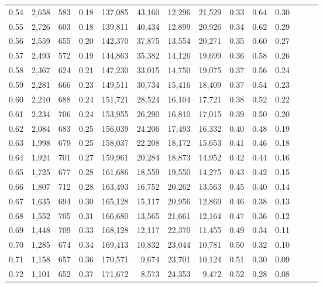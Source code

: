 \begin{tabular}{rrrrrrrrrrrrrr}
0.54 &  2,658 &  583 &  0.18 &  137,085 &   43,160 &  12,296 &  21,529 &  0.33 &  0.64 &      0.30 \\
0.55 &  2,726 &  603 &  0.18 &  139,811 &   40,434 &  12,899 &  20,926 &  0.34 &  0.62 &      0.29 \\
0.56 &  2,559 &  655 &  0.20 &  142,370 &   37,875 &  13,554 &  20,271 &  0.35 &  0.60 &      0.27 \\
0.57 &  2,493 &  572 &  0.19 &  144,863 &   35,382 &  14,126 &  19,699 &  0.36 &  0.58 &      0.26 \\
0.58 &  2,367 &  624 &  0.21 &  147,230 &   33,015 &  14,750 &  19,075 &  0.37 &  0.56 &      0.24 \\
0.59 &  2,281 &  666 &  0.23 &  149,511 &   30,734 &  15,416 &  18,409 &  0.37 &  0.54 &      0.23 \\
0.60 &  2,210 &  688 &  0.24 &  151,721 &   28,524 &  16,104 &  17,721 &  0.38 &  0.52 &      0.22 \\
0.61 &  2,234 &  706 &  0.24 &  153,955 &   26,290 &  16,810 &  17,015 &  0.39 &  0.50 &      0.20 \\
0.62 &  2,084 &  683 &  0.25 &  156,039 &   24,206 &  17,493 &  16,332 &  0.40 &  0.48 &      0.19 \\
0.63 &  1,998 &  679 &  0.25 &  158,037 &   22,208 &  18,172 &  15,653 &  0.41 &  0.46 &      0.18 \\
0.64 &  1,924 &  701 &  0.27 &  159,961 &   20,284 &  18,873 &  14,952 &  0.42 &  0.44 &      0.16 \\
0.65 &  1,725 &  677 &  0.28 &  161,686 &   18,559 &  19,550 &  14,275 &  0.43 &  0.42 &      0.15 \\
0.66 &  1,807 &  712 &  0.28 &  163,493 &   16,752 &  20,262 &  13,563 &  0.45 &  0.40 &      0.14 \\
0.67 &  1,635 &  694 &  0.30 &  165,128 &   15,117 &  20,956 &  12,869 &  0.46 &  0.38 &      0.13 \\
0.68 &  1,552 &  705 &  0.31 &  166,680 &   13,565 &  21,661 &  12,164 &  0.47 &  0.36 &      0.12 \\
0.69 &  1,448 &  709 &  0.33 &  168,128 &   12,117 &  22,370 &  11,455 &  0.49 &  0.34 &      0.11 \\
0.70 &  1,285 &  674 &  0.34 &  169,413 &   10,832 &  23,044 &  10,781 &  0.50 &  0.32 &      0.10 \\
0.71 &  1,158 &  657 &  0.36 &  170,571 &    9,674 &  23,701 &  10,124 &  0.51 &  0.30 &      0.09 \\
0.72 &  1,101 &  652 &  0.37 &  171,672 &    8,573 &  24,353 &   9,472 &  0.52 &  0.28 &      0.08 \\

\end{tabular}

